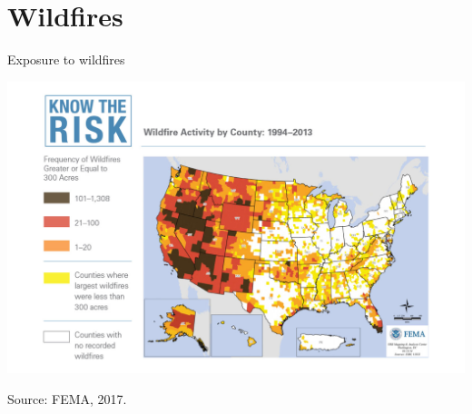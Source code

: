 \documentclass[ignorenonframetext,]{beamer}
\begin{document}
\section{Wildfires}\label{wildfires}

\begin{frame}{Exposure to wildfires}

\includegraphics[width=17.38in]{fema_wildfires}

\scriptsize Source: FEMA, 2017.

\end{frame}
\end{document}
